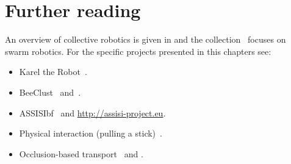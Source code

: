 \section{Further reading}

An overview of collective robotics is given in \cite{kernbach2013handbook} and the collection~\cite{sahin2005} focuses on swarm robotics. For the specific projects presented in this chapters see:
\begin{itemize}
\item Karel the Robot~\cite{karel}.
\item BeeClust~\cite{bodi2012interaction} and~\cite{Schmickl2009}.
\item ASSISIbf~\cite{schmickl2013assisi} and \url{http://assisi-project.eu}.
\item Physical interaction (pulling a stick)~\cite{Ijspeert2001}.
\item Occlusion-based transport~\cite{chen2013strategy} and \cite{gross2015}.
\end{itemize}



